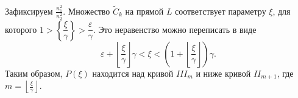 %
%
%
%
%
%
%
%


Зафиксируем $\frac{n_1^2}{n_2^2}$. 
Множество $\widetilde{C}_k$ на прямой $L$ соответствует параметру $\xi$, для которого
$1 > \left\{\dfrac{\xi}{\gamma}\right\} > \dfrac{\varepsilon}{\gamma}$.
Это неравенство можно переписать в виде
$$\varepsilon + \left\lfloor \frac{\xi}{\gamma} \right\rfloor \gamma < \xi < \left( 1 + \left\lfloor \frac{\xi}{\gamma} \right\rfloor \right) \gamma.$$
Таким образом, $P(\xi)$ находится над кривой $III_m$ и ниже кривой $II_{m+1}$, где $m=\left\lfloor \frac{\xi}{\gamma} \right\rfloor$.

